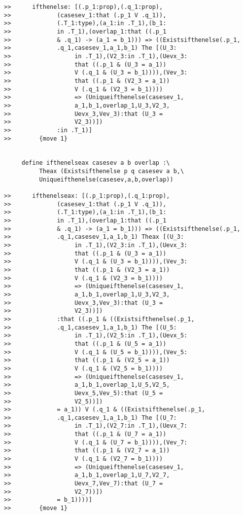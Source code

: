 \documentclass[12pt]{article}
\begin{document}
\begin{verbatim}
>>      ifthenelse: [(.p_1:prop),(.q_1:prop),
>>             (casesev_1:that (.p_1 V .q_1)),
>>             (.T_1:type),(a_1:in .T_1),(b_1:
>>             in .T_1),(overlap_1:that ((.p_1 
>>             & .q_1) -> (a_1 = b_1))) => ((Existsifthenelse(.p_1,
>>             .q_1,casesev_1,a_1,b_1) The [(U_3:
>>                  in .T_1),(V2_3:in .T_1),(Uevx_3:
>>                  that ((.p_1 & (U_3 = a_1)) 
>>                  V (.q_1 & (U_3 = b_1)))),(Vev_3:
>>                  that ((.p_1 & (V2_3 = a_1)) 
>>                  V (.q_1 & (V2_3 = b_1)))) 
>>                  => (Uniqueifthenelse(casesev_1,
>>                  a_1,b_1,overlap_1,U_3,V2_3,
>>                  Uevx_3,Vev_3):that (U_3 = 
>>                  V2_3))])
>>             :in .T_1)]
>>        {move 1}


     define ifthenelseax casesev a b overlap :\
          Theax (Existsifthenelse p q casesev a b,\
          Uniqueifthenelse(casesev,a,b,overlap))

>>      ifthenelseax: [(.p_1:prop),(.q_1:prop),
>>             (casesev_1:that (.p_1 V .q_1)),
>>             (.T_1:type),(a_1:in .T_1),(b_1:
>>             in .T_1),(overlap_1:that ((.p_1 
>>             & .q_1) -> (a_1 = b_1))) => ((Existsifthenelse(.p_1,
>>             .q_1,casesev_1,a_1,b_1) Theax [(U_3:
>>                  in .T_1),(V2_3:in .T_1),(Uevx_3:
>>                  that ((.p_1 & (U_3 = a_1)) 
>>                  V (.q_1 & (U_3 = b_1)))),(Vev_3:
>>                  that ((.p_1 & (V2_3 = a_1)) 
>>                  V (.q_1 & (V2_3 = b_1)))) 
>>                  => (Uniqueifthenelse(casesev_1,
>>                  a_1,b_1,overlap_1,U_3,V2_3,
>>                  Uevx_3,Vev_3):that (U_3 = 
>>                  V2_3))])
>>             :that ((.p_1 & ((Existsifthenelse(.p_1,
>>             .q_1,casesev_1,a_1,b_1) The [(U_5:
>>                  in .T_1),(V2_5:in .T_1),(Uevx_5:
>>                  that ((.p_1 & (U_5 = a_1)) 
>>                  V (.q_1 & (U_5 = b_1)))),(Vev_5:
>>                  that ((.p_1 & (V2_5 = a_1)) 
>>                  V (.q_1 & (V2_5 = b_1)))) 
>>                  => (Uniqueifthenelse(casesev_1,
>>                  a_1,b_1,overlap_1,U_5,V2_5,
>>                  Uevx_5,Vev_5):that (U_5 = 
>>                  V2_5))])
>>             = a_1)) V (.q_1 & ((Existsifthenelse(.p_1,
>>             .q_1,casesev_1,a_1,b_1) The [(U_7:
>>                  in .T_1),(V2_7:in .T_1),(Uevx_7:
>>                  that ((.p_1 & (U_7 = a_1)) 
>>                  V (.q_1 & (U_7 = b_1)))),(Vev_7:
>>                  that ((.p_1 & (V2_7 = a_1)) 
>>                  V (.q_1 & (V2_7 = b_1)))) 
>>                  => (Uniqueifthenelse(casesev_1,
>>                  a_1,b_1,overlap_1,U_7,V2_7,
>>                  Uevx_7,Vev_7):that (U_7 = 
>>                  V2_7))])
>>             = b_1))))]
>>        {move 1}



\end{verbatim}
\end{document}
